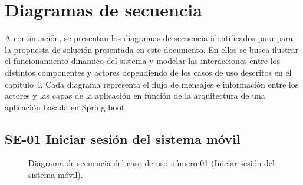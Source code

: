 \newpage






\section{Diagramas de secuencia}

A continuación, se presentan los diagramas de secuencia identificados para para la propuesta de solución presentada en este documento.
En ellos se busca ilustrar el funcionamiento dinamico del sistema y modelar las interacciones entre los distintos componentes y actores dependiendo de los casos de uso descritos en el capitulo 4. 
Cada diagrama representa el flujo de mensajes e información entre los actores y las capas de la aplicación en función de la arquitectura de una aplicación basada en Spring boot.

\subsection{SE-01 Iniciar sesión del sistema móvil}

\begin{figure}[htbp!]
	\begin{center}
		\caption{Diagrama de secuencia del caso de uso número 01 (Iniciar sesión del sistema móvil).}
		\label{fig:Diagrama de secuencia CU-01}
	\end{center}
\end{figure}

